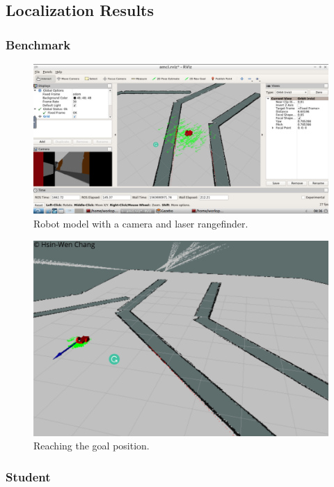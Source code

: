 \documentclass[10pt,journal,compsoc]{IEEEtran}
\begin{document}
\subsection{Localization Results}
\subsubsection{Benchmark}
\begin{figure}[thpb]
      \centering
      \includegraphics[width=\linewidth]{acml.png}
      \caption{Robot model with a camera and laser rangefinder.}
      \label{fig:robot1}
\end{figure}
\begin{figure}[thpb]
      \centering
      \includegraphics[width=\linewidth]{f2.png}
      \caption{Reaching the goal position.}
      \label{fig:robot1}
\end{figure}
\subsubsection{Student}
\end{document}
